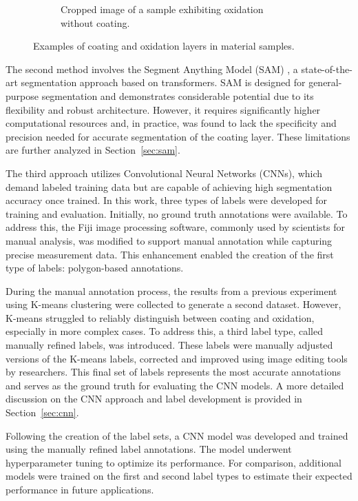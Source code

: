 \begin{figure}[H]
\begin{subfigure}{0.4\textwidth}
     \caption{Cropped image of a sample exhibiting oxidation without coating.} \label{fig:oxidation}        
     \label{fig:oxidation}
    \end{subfigure}
    \caption{Examples of coating and oxidation layers in material samples.}
    \label{fig:coating-oxidation}
\end{figure}


The second method involves the Segment Anything Model (SAM) \cite{kirillov2023segany}, a state-of-the-art segmentation approach based on transformers. SAM is designed for general-purpose segmentation and demonstrates considerable potential due to its flexibility and robust architecture. However, it requires significantly higher computational resources and, in practice, was found to lack the specificity and precision needed for accurate segmentation of the coating layer. These limitations are further analyzed in Section~\ref{sec:sam}.

The third approach utilizes Convolutional Neural Networks (CNNs), which demand labeled training data but are capable of achieving high segmentation accuracy once trained. In this work, three types of labels were developed for training and evaluation. Initially, no ground truth annotations were available. To address this, the Fiji image processing software, commonly used by scientists for manual analysis, was modified to support manual annotation while capturing precise measurement data. This enhancement enabled the creation of the first type of labels: polygon-based annotations.

During the manual annotation process, the results from a previous experiment using K-means clustering were collected to generate a second dataset. However, K-means struggled to reliably distinguish between coating and oxidation, especially in more complex cases. To address this, a third label type, called manually refined labels, was introduced. These labels were manually adjusted versions of the K-means labels, corrected and improved using image editing tools by researchers. This final set of labels represents the most accurate annotations and serves as the ground truth for evaluating the CNN models. A more detailed discussion on the CNN approach and label development is provided in Section~\ref{sec:cnn}.

Following the creation of the label sets, a CNN model was developed and trained using the manually refined label annotations. The model underwent hyperparameter tuning to optimize its performance. For comparison, additional models were trained on the first and second label types to estimate their expected performance in future applications.

